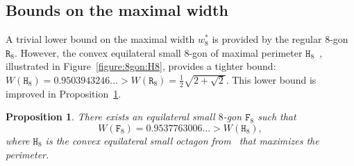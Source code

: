 \documentclass[a4paper,12pt]{article}
\theoremstyle{definition}
\theoremstyle{plain}
\newtheorem{proposition}{Proposition}
\newcommand{\geo}[1]{\mathtt{#1}}
\begin{document}
\subsection{Bounds on the maximal width}
A trivial lower bound on the maximal width $w_8^*$ is provided by the regular $8$-gon $\geo{R}_8$. However, the convex equilateral small $8$-gon of maximal perimeter $\geo{H}_8$~\cite{audet2004}, illustrated in Figure~\ref{figure:8gon:H8}, provides a tighter bound: $W(\geo{H}_8) = 0.9503943246\ldots > W(\geo{R}_8) = \frac{1}{2}\sqrt{2+\sqrt{2}}$. This lower bound is improved in Proposition~\ref{thm:F8:bound}.

\begin{proposition}\label{thm:F8:bound}
There exists an equilateral small $8$-gon $\geo{F}_8$ such that
	\[
	W(\geo{F}_8) = 0.9537763006\ldots > W(\geo{H}_8),
	\]
	where $\geo{H}_8$ is the convex equilateral small octagon from~\cite{audet2004} that maximizes the perimeter.
\end{proposition}
\end{document}
